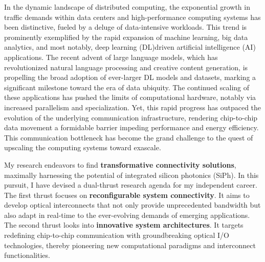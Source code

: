 In the dynamic landscape of distributed computing, the exponential growth in traffic demands within data centers and high-performance computing systems has been distinctive, fueled by a deluge of data-intensive workloads. This trend is prominently exemplified by the rapid expansion of machine learning, big data analytics, and most notably, deep learning (DL)\textendash driven artificial intelligence (AI) applications. The recent advent of large language models, which has revolutionized natural language processing and creative content generation, is propelling the broad adoption of ever-larger DL models and datasets, marking a significant milestone toward the era of data ubiquity. The continued scaling of these applications has pushed the limits of computational hardware, notably via increased parallelism and specialization. Yet, this rapid progress has outpaced the evolution of the underlying communication infrastructure, rendering chip-to-chip data movement a formidable barrier impeding performance and energy efficiency. This communication bottleneck has become the grand challenge to the quest of upscaling the computing systems toward exascale.

My research endeavors to find \textbf{transformative connectivity solutions}, maximally harnessing the potential of integrated silicon photonics (SiPh). In this pursuit, I have devised a dual-thrust research agenda for my independent career. The first thrust focuses on \textbf{reconfigurable system connectivity}. It aims to develop optical interconnects that not only provide unprecedented bandwidth but also adapt in real-time to the ever-evolving demands of emerging applications. The second thrust looks into \textbf{innovative system architectures}. It targets redefining chip-to-chip communication with groundbreaking optical I/O technologies, thereby pioneering new computational paradigms and interconnect functionalities.

